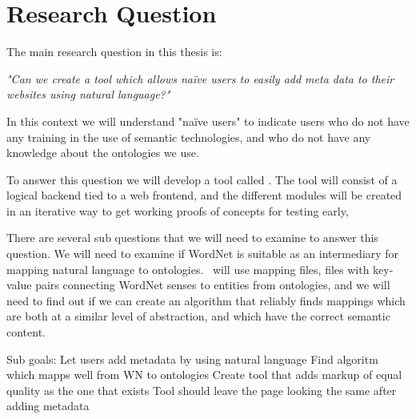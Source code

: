 \section{Research Question}
The main research question in this thesis is:

\emph{"Can we create a tool which allows naïve users to easily add meta data to their websites using natural language?"}

In this context we will understand "naïve users" to indicate users who do not have any training in the use of semantic technologies,
and who do not have any knowledge about the ontologies we use.

To answer this question we will develop a tool called \theartefact.
The tool will consist of a logical backend tied to a web frontend,
and the different modules will be created in an iterative way to get working proofs of concepts for testing early,

There are several sub questions that we will need to examine to answer this question.
We will need to examine if WordNet is suitable as an intermediary for mapping natural language to ontologies.
\Theartefact\ will use mapping files,
files with key-value pairs connecting WordNet senses to entities from ontologies,
and we will need to find out if we can create an algorithm that reliably finds mappings which are both
at a similar level of abstraction, and which have the correct semantic content.


Sub goals:
Let users add metadata by using natural language
Find algoritm which mapps well from WN to ontologies
Create tool that adds markup of equal quality as the one that exists
Tool should leave the page looking the same after adding metadata





